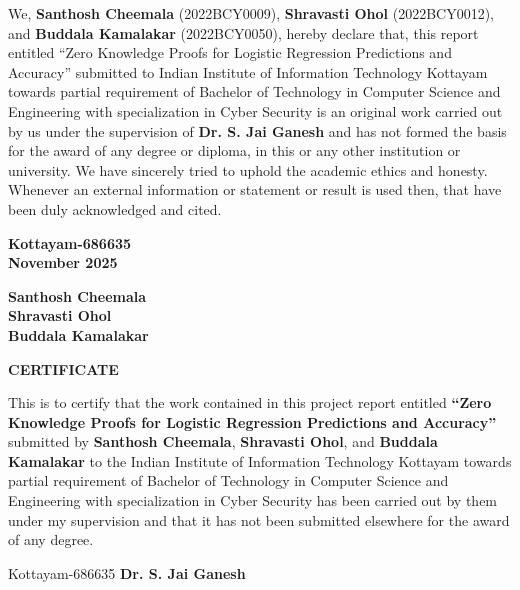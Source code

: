 \documentclass[12pt,a4wide]{report}
\begin{document}
\noindent We, \textbf{Santhosh Cheemala} (2022BCY0009), \textbf{Shravasti Ohol} (2022BCY0012), and \textbf{Buddala Kamalakar} (2022BCY0050), hereby declare that, this report entitled “Zero Knowledge Proofs for Logistic Regression Predictions and Accuracy” submitted to Indian Institute of Information Technology Kottayam towards partial requirement of Bachelor of Technology in Computer Science and Engineering with specialization in Cyber Security is an original work carried out by us under the supervision of \textbf{Dr. S. Jai Ganesh} and has not formed the basis for the award of any degree or diploma, in this or any other institution or university. We have sincerely tried to uphold the academic ethics and honesty. Whenever an external information or statement or result is used then, that have been duly acknowledged and cited.

\vspace*{4cm}

\begin{minipage}{0.45\textwidth}
    \raggedright
    \textbf{Kottayam-686635} \\[0.5cm]
    \textbf{November 2025}
\end{minipage}%
\hfill
\begin{minipage}{0.45\textwidth}
    \raggedleft
    \textbf{Santhosh Cheemala} \\[1cm]
    \textbf{Shravasti Ohol} \\[1cm]
    \textbf{Buddala Kamalakar}
\end{minipage}


\clearpage

\begin{center}
{\large\bf CERTIFICATE}
\end{center}

\noindent This is to certify that the work contained in this project report entitled \textbf{“Zero Knowledge Proofs for Logistic Regression Predictions and Accuracy”} submitted by \textbf{Santhosh Cheemala}, \textbf{Shravasti Ohol}, and \textbf{Buddala Kamalakar} to the Indian Institute of Information Technology Kottayam towards partial requirement of Bachelor of Technology in Computer Science and Engineering with specialization in Cyber Security has been carried out by them under my supervision and that it has not been submitted elsewhere for the award of any degree.

\vspace{4cm}

\noindent Kottayam-686635 \hfill \textbf{Dr. S. Jai Ganesh}
\end{document}
